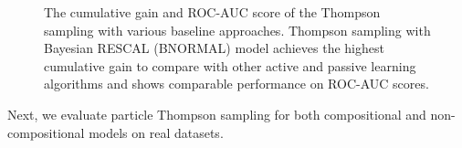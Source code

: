 \begin{figure}[t]
	\centering
	
	\caption{\label{fig:c_gain}The cumulative gain and ROC-AUC score of the Thompson sampling 
	with various baseline approaches. Thompson sampling with Bayesian RESCAL (BNORMAL)
	model achieves the highest cumulative gain to compare with other active and 
	passive learning algorithms and shows comparable performance on ROC-AUC scores.}
\end{figure}

Next, we evaluate particle Thompson sampling for both compositional and non-compositional models on real datasets.

